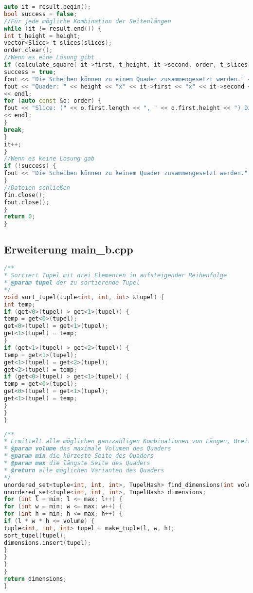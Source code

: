 \documentclass[a4paper,10pt,ngerman]{scrartcl}
\begin{document}
\begin{lstlisting}[frame=single,language=C++,title=Methode main,breaklines=true,label={lst:code_main}]
auto it = result.begin();
bool success = false;
//Für jede mögliche Kombination der Seitenlängen
while (it != result.end()) {
int t_height = height;
vector<Slice> t_slices(slices);
order.clear();
//Wenn es eine Lösung gibt
if (calculate_square( it->first, t_height, it->second, order, t_slices)) {
success = true;
fout << "Die Scheiben können zu einem Quader zusammengesetzt werden." << endl;
fout << "Quader: " << height << "x" << it->first << "x" << it->second << " V(" << volume << ")" << endl
<< endl;
for (auto const &o: order) {
fout << "Slice: (" << o.first.length << ", " << o.first.height << ") Dimension: " << to_string(o.second)
<< endl;
}
break;
}
it++;
}
//Wenn es keine Lösung gab
if (!success) {
fout << "Die Scheiben können zu keinem Quader zusammengesetzt werden." << endl;
}
//Dateien schließen
fin.close();
fout.close();
}
return 0;
}
    \end{lstlisting}

    \subsection{Erweiterung main\_b.cpp}\label{subsec:erweiterung}

    \begin{lstlisting}[frame=single,language=C++,title=Methode sort\_tupel,breaklines=true,label={lst:code_sortTupel}]
/**
* Sortiert Tupel mit drei Elementen in aufsteigender Reihenfolge
* @param tupel der zu sortierende Tupel
*/
void sort_tupel(tuple<int, int, int> &tupel) {
int temp;
if (get<0>(tupel) > get<1>(tupel)) {
temp = get<0>(tupel);
get<0>(tupel) = get<1>(tupel);
get<1>(tupel) = temp;
}
if (get<1>(tupel) > get<2>(tupel)) {
temp = get<1>(tupel);
get<1>(tupel) = get<2>(tupel);
get<2>(tupel) = temp;
if (get<0>(tupel) > get<1>(tupel)) {
temp = get<0>(tupel);
get<0>(tupel) = get<1>(tupel);
get<1>(tupel) = temp;
}
}
}
    \end{lstlisting}

    \newpage

    \begin{lstlisting}[frame=single,language=C++,title=Methode find\_dimensions,breaklines=true,label={lst:code_findDimensions}]
/**
* Ermittelt alle möglichen ganzzahligen Kombinationen von Längen, Breiten und Höhen für einen Quader
* @param volume das maximale Volumen des Quaders
* @param min die kürzeste Seite des Quaders
* @param max die längste Seite des Quaders
* @return alle möglichen Varianten des Quaders
*/
unordered_set<tuple<int, int, int>, TupelHash> find_dimensions(int volume, const int &min, const int &max) {
unordered_set<tuple<int, int, int>, TupelHash> dimensions;
for (int l = min; l <= max; l++) {
for (int w = min; w <= max; w++) {
for (int h = min; h <= max; h++) {
if (l * w * h <= volume) {
tuple<int, int, int> tupel = make_tuple(l, w, h);
sort_tupel(tupel);
dimensions.insert(tupel);
}
}
}
}
return dimensions;
}
    \end{lstlisting}
\end{document}
